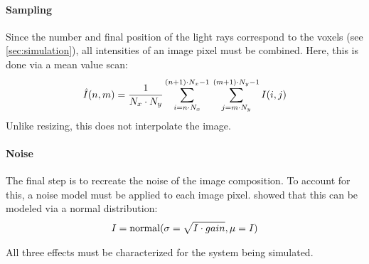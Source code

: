 \paragraph{Sampling}
Since the number and final position of the light rays correspond to the voxels (see \cref{sec:simulation}), all intensities of an image pixel must be combined.
Here, this is done via a mean value scan:
\begin{align}
    \hat{I}(n,m) =\frac{1}{N_x \cdot N_y} \sum_{i=n \cdot N_x}^{(n+1) \cdot N_x-1 \vphantom{N_y}} \hspace{0.5ex} \sum_{j=m \cdot N_y}^{(m+1) \cdot N_y-1} I(i,j)
\end{align}
Unlike resizing, this does not interpolate the image.
%
\paragraph{Noise}
The final step is to recreate the noise of the image composition.
To account for this, a noise model must be applied to each image pixel.
\cite{Wiese:887678} showed that this can be modeled via a normal distribution:
%
\begin{align}
    I = \operatorname{normal}(\sigma = \sqrt{I \cdot gain}, \mu=I)
\end{align}
%
\par
%
All three effects must be characterized for the system being simulated.